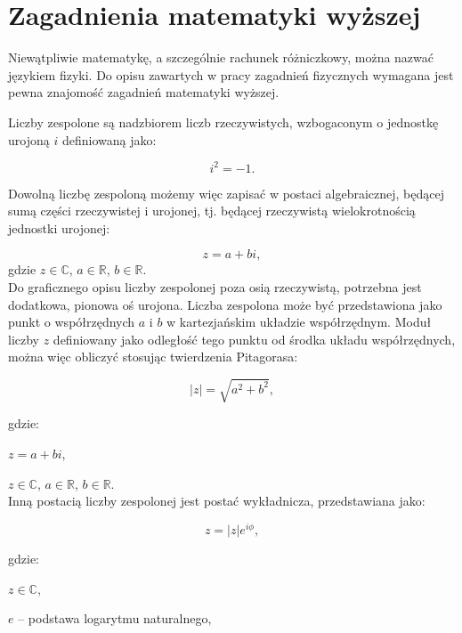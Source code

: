 \documentclass{SGGW-thesis}
\begin{document}
	\section{Zagadnienia matematyki wyższej}
	Niewątpliwie matematykę, a szczególnie rachunek różniczkowy, można nazwać językiem fizyki. Do opisu zawartych w pracy zagadnień fizycznych wymagana jest pewna znajomość zagadnień matematyki wyższej.

	Liczby zespolone są nadzbiorem liczb rzeczywistych, wzbogaconym o jednostkę urojoną $i$ \cite{liczby zespolone}definiowaną jako: 
	
	\begin{equation}
	i^2=-1.
	\end{equation}
	
	Dowolną liczbę zespoloną możemy więc zapisać w postaci algebraicznej, będącej sumą części rzeczywistej i urojonej, tj. będącej rzeczywistą wielokrotnością jednostki urojonej:
	
	\begin{equation}
	z = a+bi,
	\end{equation}
	gdzie
	$z \in \mathbb{C}$,
	$a \in \mathbb{R}$,
	$b \in \mathbb{R}$.\\
	
	Do graficznego opisu liczby zespolonej poza osią rzeczywistą, potrzebna jest dodatkowa, pionowa oś urojona. Liczba zespolona może być przedstawiona jako punkt o współrzędnych $a$ i $b$ w kartezjańskim układzie współrzędnym. Moduł liczby $z$ definiowany jako odległość tego punktu od środka układu współrzędnych, można więc obliczyć stosując twierdzenia Pitagorasa:
	
	\begin{equation}
	|z| = \sqrt{a^2+b^2},
	\end{equation}
	
	gdzie:
	
	$ z = a + bi$,
	
	$z \in \mathbb{C}$,
	$a \in \mathbb{R}$,
	$b \in \mathbb{R}$.\\
	
	Inną postacią liczby zespolonej jest postać wykładnicza, przedstawiana jako:
	
	\begin{equation}
	z = |z|e^{i\phi},
	\end{equation}
	
	gdzie:
	
	$z \in \mathbb{C}$,
	
	$e$ -- podstawa logarytmu naturalnego,
	
\end{document}
